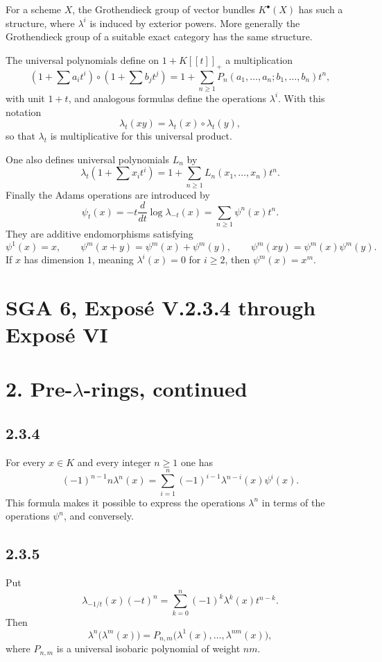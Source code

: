 \documentclass[11pt]{article}
\theoremstyle{plain}
\theoremstyle{definition}
\theoremstyle{remark}
\begin{document}
For a scheme $X$, the Grothendieck group of vector bundles $K^{\bullet}(X)$ has such a structure, where $\lambda^i$ is induced by exterior powers. More generally the Grothendieck group of a suitable exact category has the same structure.

The universal polynomials define on $1+K[[t]]_+$ a multiplication
\[
(1+\sum a_it^i)\circ(1+\sum b_jt^j)
=1+\sum_{n\ge1}P_n(a_1,\ldots,a_n;b_1,\ldots,b_n)t^n,
\]
with unit $1+t$, and analogous formulas define the operations $\lambda^i$. With this notation
\[
\lambda_t(xy)=\lambda_t(x)\circ\lambda_t(y),
\]
so that $\lambda_t$ is multiplicative for this universal product.

One also defines universal polynomials $L_n$ by
\[
\lambda_t(1+\sum x_it^i)=1+\sum_{n\ge1}L_n(x_1,\ldots,x_n)t^n.
\]
Finally the Adams operations are introduced by
\[
\psi_t(x)=-t\frac{d}{dt}\log\lambda_{-t}(x)=\sum_{n\ge1}\psi^n(x)t^n.
\]
They are additive endomorphisms satisfying
\[
\psi^1(x)=x,
\qquad
\psi^m(x+y)=\psi^m(x)+\psi^m(y),
\qquad
\psi^m(xy)=\psi^m(x)\psi^m(y).
\]
If $x$ has dimension $1$, meaning $\lambda^i(x)=0$ for $i\ge2$, then $\psi^m(x)=x^m$.


\clearpage
\section*{SGA 6, Exposé V.2.3.4 through Exposé VI}

\section*{2. Pre-$\lambda$-rings, continued}

\subsection*{2.3.4}
For every $x\in K$ and every integer $n\geq 1$ one has
\begin{equation}\label{eq:2.3.4}
(-1)^{n-1}n\lambda^n(x)=\sum_{i=1}^{n}(-1)^{i-1}\lambda^{n-i}(x)\psi^i(x).
\end{equation}
This formula makes it possible to express the operations $\lambda^n$ in terms of the operations $\psi^n$, and conversely.

\subsection*{2.3.5}
Put
\begin{equation}\label{eq:2.3.5a}
\lambda_{-1/t}(x)(-t)^n=\sum_{k=0}^{n}(-1)^k\lambda^k(x)t^{n-k}.
\end{equation}
Then
\begin{equation}\label{eq:2.3.5b}
\lambda^n\bigl(\lambda^m(x)\bigr)=P_{n,m}\bigl(\lambda^1(x),\ldots,\lambda^{nm}(x)\bigr),
\end{equation}
where $P_{n,m}$ is a universal isobaric polynomial of weight $nm$.
\end{document}
